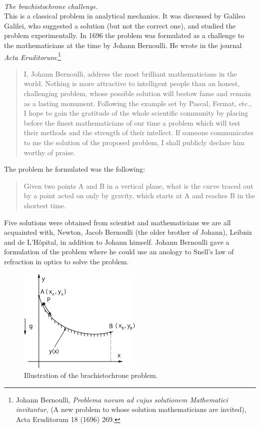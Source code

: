 \documentclass[11pt,a4paper]{report}
\newcounter{excount}[chapter]
\newenvironment{exercise}[1][]{\addtocounter{excount}{1} \noindent {\bf Problem
    \arabic{excount} \ \ #1}\hspace{2mm}}{\vspace{4mm}}
\begin{document}
\begin{exercise}[Midterm Exam 2008]\\
{\em The brachistochrone challenge.}\\
This is a classical problem in analytical mechanics. It was discussed by Galileo Galilei, who suggested a solution (but not the correct one), and studied the problem experimentally. In 1696 the problem was formulated as a challenge to the mathematicians at the time by Johann Bernoulli. He wrote in the journal {\em Acta Eruditorum}:\footnote{Johann Bernoulli, {\em Problema novum ad cujus solutionem Mathematici invitantur,} (A new problem to whose solution mathematicians are invited), Acta Eruditorum 18 (1696) 269.}

\begin{quote}
I, Johann Bernoulli, address the most brilliant mathematicians in the world. Nothing is more
attractive to intelligent people than an honest, challenging problem, whose possible solution
will bestow fame and remain as a lasting monument. Following the example set by Pascal,
Fermat, etc., I hope to gain the gratitude of the whole scientific community by placing
before the finest mathematicians of our time a problem which will test their methods and the
strength of their intellect. If someone communicates to me the solution of the proposed
problem, I shall publicly declare him worthy of praise.
\end{quote}

The problem he formulated was the following:

\begin{quote}
Given two points A and B in a vertical plane, what is the curve traced out by a point acted
on only by gravity, which starts at A and reaches B in the shortest time.
\end{quote}

Five solutions were obtained from scientist and mathematicians we are all acquainted with, Newton,
Jacob Bernoulli (the older brother of Johann), Leibniz and de L'H{\^o}pital, in addition to Johann himself. Johann Bernoulli gave a formulation of the problem where he could use an anology to Snell's law of refraction in optics to solve the problem.

\begin{figure}[h]
\begin{center}
\includegraphics[height=5cm]{Brachistochrone.eps}
\end{center}
\caption{Illustration of the brachistochrone problem.}
\label{fig:brach}
\end{figure}


\end{exercise}
\end{document}
